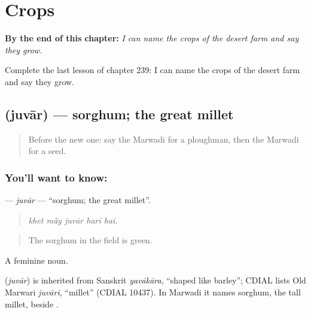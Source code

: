 
\chapter{Crops}
\label{ch:mw-crops}

\begin{chapteropening}
\textbf{By the end of this chapter:} \emph{I can name the crops of the desert farm and say they grow.}

Complete the last lesson of chapter 239: I can name the crops of the desert farm and say they grow.
\end{chapteropening}

\section[\texorpdfstring{\mw{जुवार} (juvār)}{जुवार (juvār)}]{ (juvār) — sorghum; the great millet}

\label{lesson:MW-C239-juvar}



\begin{quote}
Before the new one: say the Marwadi for a ploughman, then the Marwadi for a seed.
\end{quote}

\subsection*{You'll want to know: }
\textbf{} — \emph{juvār} — \textquotedblleft{}sorghum; the great millet\textquotedblright{}.

\begin{quote}
    
\end{quote}

\begin{quote}
\emph{khet mā̃y juvār harī hai.}
\end{quote}

\begin{quote}
The sorghum in the field is green.
\end{quote}

A feminine noun.

\begin{cousinweb}
\textbf{} (\emph{juvār}) is inherited from Sanskrit \emph{yavākāra}, \textquotedblleft{}shaped like barley\textquotedblright{}; CDIAL lists Old Marwari \emph{juvāri}, \textquotedblleft{}millet\textquotedblright{} (CDIAL 10437). In Marwadi it names sorghum, the tall millet, beside \textbf{}.
\end{cousinweb}

